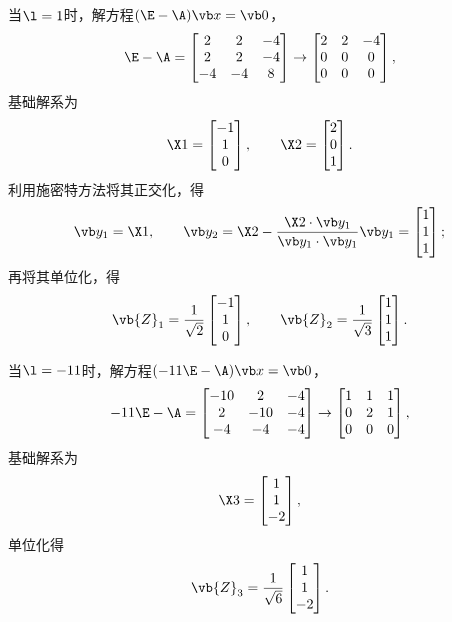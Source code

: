 \begin{example}
\begin{solution}
当\(\l=1\)时，解方程\((\E-\A)\x=\vb0\)，\[
	\E-\A = \begin{bmatrix}
		2 & 2 & -4 \\
		2 & 2 & -4 \\
		-4 & -4 & 8
	\end{bmatrix}
	\to \begin{bmatrix}
		2 & 2 & -4 \\
		0 & 0 & 0 \\
		0 & 0 & 0
	\end{bmatrix},
\]基础解系为\[
	\X1 = \begin{bmatrix} -1 \\ 1 \\ 0 \end{bmatrix},
	\qquad
	\X2 = \begin{bmatrix} 2 \\ 0 \\ 1 \end{bmatrix}.
\]
利用施密特方法将其正交化，得\[
	\y_1=\X1,
	\qquad
	\y_2=\X2-\frac{\X2\cdot\y_1}{\y_1\cdot\y_1}\y_1
	=\begin{bmatrix} 1 \\ 1 \\ 1 \end{bmatrix};
\]再将其单位化，得\[
	\vb{Z}_1
	= \frac{1}{\sqrt{2}} \begin{bmatrix} -1 \\ 1 \\ 0 \end{bmatrix},
	\qquad
	\vb{Z}_2
	= \frac{1}{\sqrt{3}} \begin{bmatrix} 1 \\ 1 \\ 1 \end{bmatrix}.
\]

当\(\l=-11\)时，解方程\((-11\E-\A)\x=\vb0\)，\[
	-11\E-\A = \begin{bmatrix}
		-10 & 2 & -4 \\
		2 & -10 & -4 \\
		-4 & -4 & -4
	\end{bmatrix}
	\to \begin{bmatrix}
		1 & 1 & 1 \\
		0 & 2 & 1 \\
		0 & 0 & 0
	\end{bmatrix},
\]
基础解系为\[
	\X3 = \begin{bmatrix} 1 \\ 1 \\ -2 \end{bmatrix},
\]
单位化得\[
	\vb{Z}_3 = \frac{1}{\sqrt{6}} \begin{bmatrix} 1 \\ 1 \\ -2 \end{bmatrix}.
\]


\end{solution}
\end{example}

